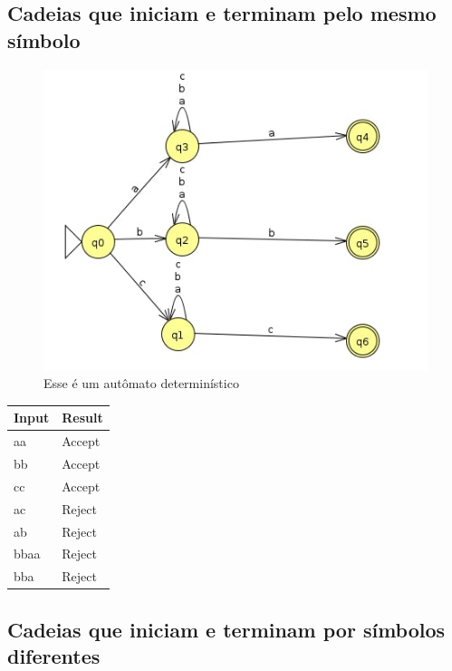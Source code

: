\documentclass[11pt]{article}
\begin{document}
\subsection{Cadeias que iniciam e terminam pelo mesmo símbolo}
\label{sec:org01e040f}
\begin{figure}[htbp]
\centering
\includegraphics[width=.9\linewidth]{./q1/e/q1e.jpg}
\caption{\label{fig:org465e150}
Esse é um autômato determinístico}
\end{figure}

\begin{center}
\begin{tabular}{ll}
Input & Result\\
\hline
aa & Accept\\
bb & Accept\\
cc & Accept\\
ac & Reject\\
ab & Reject\\
bbaa & Reject\\
bba & Reject\\
\end{tabular}
\end{center}
\subsection{Cadeias que iniciam e terminam por símbolos diferentes}
\label{sec:org40b1a8a}
\end{document}

